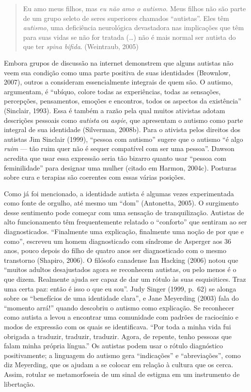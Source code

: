 \begin{quote}
Eu amo meus filhos, mas \emph{eu não amo o autismo}. Meus filhos não são
parte de um grupo seleto de seres superiores chamados ``autistas''. Eles
têm \emph{autismo}, uma deficiência neurológica devastadora nas
implicações que têm para suas vidas se não for tratada (\ldots{}) não é mais
normal ser autista do que ter \emph{spina bifida}. (Weintraub, 2005)
\end{quote}

Embora grupos de discussão na internet demonstrem que alguns autistas
não veem sua condição como uma parte positiva de suas identidades
(Brownlow, 2007), outros a consideram essencialmente integrais de quem
são. O autismo, argumentam, é ``ubíquo, colore todas as experiências,
todas as sensações, percepções, pensamentos, emoções e encontros, todos
os aspectos da existência'' (Sinclair, 1993). Essa é também a razão pela
qual muitos ativistas adotam descrições pessoais como \emph{autista} ou
\emph{aspie}, que apresentam o autismo como parte integral de sua
identidade (Silverman, 2008b). Para o ativista pelos direitos dos
autistas Jim Sinclair (1999), ``pessoa com autismo'' sugere que o
autismo ``é algo \emph{ruim} --- tão ruim quer não é sequer compatível
com ser uma pessoa''. Dawson acredita que usar essa expressão seria tão
bizarro quanto usar ``pessoa com feminilidade'' para designar uma mulher
(citado em Harmon, 2004c). Posturas sobre cura e terapias são coerentes
com essas várias posições.

Como já foi mencionado, a identidade autista é algumas vezes
experimentada como fonte de orgulho, até mesmo um ``dom'' (Antonetta,
2005). O surgimento desse sentimento pode começar com uma sensação de
tranquilização. Autistas de alto funcionamento têm frequentemente
relatado o ``conforto'' que sentiram ao ser diagnosticados. ``Finalmente
uma explicação, finalmente uma noção de por que e como'', escreveu um
homem diagnosticado com síndrome de Asperger aos 36 anos, pouco depois
do filho de quatro anos ser diagnosticado com o mesmo transtorno
(Shapiro, 2006). O filósofo canadense Ian Hacking (2006) notou que
``muitos adultos desajustados agora se reconhecem autistas, ou pelo
menos é o que dizem. Realmente ajuda ser capaz de dar um rótulo às suas
esquisitices. Traz uma certa paz: então é isso o que eu sou''. Judy
Singer (1999, p.~62) se alonga sobre os ``benefícios de uma identidade
clara'', e Jane Meyerding (2003) fala do ``momento arrá!'' quando
descobriu o autismo como explicação. Se reconhecer como autista a levou
a encontrar uma comunidade com padrões de raciocínio e modos de
expressão com os quais se identificava. ``Por toda a minha vida fui obrigada a
traduzir, traduzir, traduzir. Agora, de repente, tenho pessoas que falam
minha própria língua.'' Os autistas podem usar o rótulo diagnóstico
positivamente; a linguagem do autismo gera ``indicações'' e
``abreviações'', como diz Meyerding, que os ajudam a se colocar em
relação à cultura que os cerca. Assim, rotular se metamorfoseia de um
sinal de estigma em um instrumento de libertação.

